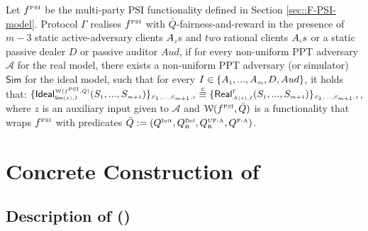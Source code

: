  \vspace{-2.3mm}
\begin{definition}[\ep]\label{def::PSI-Q-fair-reward}
Let $f^{\scriptscriptstyle \text{PSI}}$ be the multi-party PSI functionality defined in Section \ref{sec::F-PSI-model}. Protocol $\Gamma$ realises  $f^{\scriptscriptstyle \text{PSI}}$ with $\bar Q$-fairness-and-reward in the presence of $m-3$ static active-adversary clients $A_{\scriptscriptstyle j}$s and $two$ rational clients $A_{\scriptscriptstyle i}s$ or a static passive dealer  $D$ or passive auditor $Aud$, if for every non-uniform PPT adversary $\mathcal{A}$ for the real model, there exists a non-uniform PPT adversary (or simulator) $\mathsf{Sim}$ for the ideal model, such that for every $I\in \{A_{\scriptscriptstyle 1},...,A_{\scriptscriptstyle m}, D, Aud\}$, it holds that: 
$\{\mathsf {Ideal}^{\scriptscriptstyle \mathcal{W}(f^{\scriptscriptstyle \text{PSI}}, \bar Q)}_{\scriptscriptstyle \mathsf{Sim}(z), I}(S_{\scriptscriptstyle 1},..., S_{\scriptscriptstyle m+1})\}_{\scriptscriptstyle S_{\scriptscriptstyle 1},..., S_{\scriptscriptstyle m+1},z}\stackrel{c}{\equiv} \{\mathsf{Real}_{\scriptscriptstyle \mathcal{A}(z), I}^{\scriptscriptstyle \Gamma}(S_{\scriptscriptstyle 1}\\,..., S_{\scriptscriptstyle m+1}) \}_{\scriptscriptstyle S_{\scriptscriptstyle 1},..., S_{\scriptscriptstyle m+1},z}$, 
where  $z$ is an auxiliary input given to $\mathcal{A}$ and  $\mathcal{W}(f^{\scriptscriptstyle \text{PSI}}, \bar Q)$ is a functionality that wraps $f^{\scriptscriptstyle \text{PSI}}$ with predicates $\bar Q:=(Q^{\scriptscriptstyle \text{Init}},  Q^{\scriptscriptstyle \text{Del}}_{\scriptscriptstyle\text{R}}, Q^{\scriptscriptstyle \text{UF-A}}_{\scriptscriptstyle \text{R}}, Q^{\scriptscriptstyle \text{F-A}})$. 
  \end{definition}




 \vspace{-5mm}
\section{Concrete Construction of \ep}


 





 \vspace{-1mm}

\subsection{Description of \withRew (\epsi)}
 \vspace{-.6mm}

